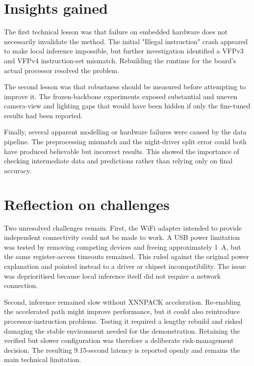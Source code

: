 
\section{Insights gained}
\label{sec:eval-insights}

The first technical lesson was that failure on embedded hardware does not necessarily invalidate the method. The initial "Illegal instruction" crash appeared to make local inference impossible, but further investigation identified a VFPv3 and VFPv4 instruction-set mismatch. Rebuilding the runtime for the board's actual processor resolved the problem.

The second lesson was that robustness should be measured before attempting to improve it. The frozen-backbone experiments exposed substantial and uneven camera-view and lighting gaps that would have been hidden if only the fine-tuned results had been reported.

Finally, several apparent modelling or hardware failures were caused by the data pipeline. The preprocessing mismatch and the night-driver split error could both have produced believable but incorrect results. This showed the importance of checking intermediate data and predictions rather than relying only on final accuracy.

\section{Reflection on challenges}
\label{sec:eval-challenges}

Two unresolved challenges remain. First, the WiFi adapter intended to provide independent connectivity could not be made to work. A USB power limitation was tested by removing competing devices and freeing approximately 1~A, but the same register-access timeouts remained. This ruled against the original power explanation and pointed instead to a driver or chipset incompatibility. The issue was deprioritised because local inference itself did not require a network connection.

Second, inference remained slow without XNNPACK acceleration. Re-enabling the accelerated path might improve performance, but it could also reintroduce processor-instruction problems. Testing it required a lengthy rebuild and risked damaging the stable environment needed for the demonstration. Retaining the verified but slower configuration was therefore a deliberate risk-management decision. The resulting 9.15-second latency is reported openly and remains the main technical limitation.

